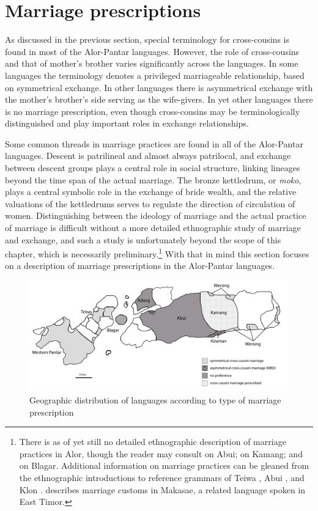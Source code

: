 \section{Marriage prescriptions}\label{sec:5:4}
As discussed in the previous section, special terminology for cross-cousins is found in most of the Alor-Pantar languages. However, the role of cross-cousins and that of mother's brother varies significantly across the languages. In some languages the terminology denotes a privileged marriageable relationship, based on symmetrical exchange. In other languages there is asymmetrical exchange with the mother's brother's side serving as the wife-givers. In yet other languages there is no marriage prescription, even though cross-cousins may be terminologically distinguished and  play important roles in exchange relationships. 

Some common threads in marriage practices are found in all of the Alor-Pantar languages. Descent is patrilineal and almost always patrilocal, and exchange between descent groups plays a central role in social structure, linking lineages beyond the time span of the actual marriage. The bronze kettledrum, or \textit{moko}, plays a central symbolic role in the exchange of bride wealth, and the relative valuations of the kettledrums serves to regulate the direction of circulation of women. Distinguishing between the ideology of marriage and the actual practice of marriage is difficult without a more detailed ethnographic study of marriage and exchange, and such a study is unfortunately beyond the scope of this chapter, which is necessarily preliminary.\footnote{There is as of yet still no detailed ethnographic description of marriage practices in Alor, though the reader may consult \citet{Nicolspeyer1940} on Abui; \citet{Stokhof1977} on Kamang; and \citet{Steinhauer2010} on Blagar. Additional information on marriage practices can be gleaned from the ethnographic introductions to reference grammars of Teiwa \citep{Klamer2010grammar}, Abui \citep{Kratochvil2007}, and Klon \citep{Baird2008}. \citet{Forman1980} describes marriage customs in Makasae, a related language spoken in East Timor.} With that in mind this section focuses on a description of marriage prescriptions in the Alor-Pantar languages. 

\begin{figure}[t]
\centering
\includegraphics[width=\textwidth]{figures/Holton_ch5_fig16_grey.pdf}
\caption{Geographic distribution of languages according to type of marriage prescription}
\label{fig:5:16}
\end{figure}

